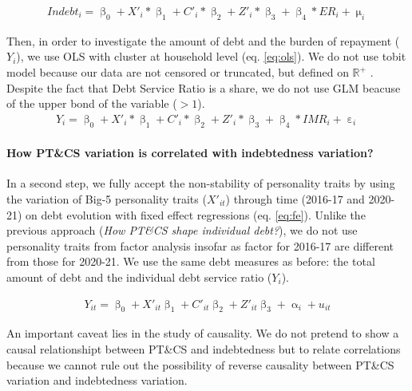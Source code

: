\documentclass[a4paper, 11pt, onecolumn]{article}
\begin{document}
\begin{equation}\label{eq:probit}
\begin{split}
Indebt_{i}=\upbeta_{0}+X'_{i}*\upbeta_{1}+C'_{i}*\upbeta_{2}+Z'_{i}*\upbeta_{3}+\upbeta_{4}*ER_{i}+\upmu_{i}
\end{split}
\end{equation}

Then, in order to investigate the amount of debt and the burden of repayment ($Y_{i}$), we use OLS with cluster at household level (eq. \ref{eq:ols}).
We do not use tobit model because our data are not censored or truncated, but defined on $\mathbb{R}^{+}$ \citep{Maddala1991}.
Despite the fact that Debt Service Ratio is a share, we do not use GLM beacuse of the upper bond of the variable ($>1$).
\begin{equation}\label{eq:ols}
\begin{split}
Y_{i}=\upbeta_{0}+X'_{i}*\upbeta_{1}+C'_{i}*\upbeta_{2}+Z'_{i}*\upbeta_{3}+\upbeta_{4}*IMR_{i}+\upepsilon_i
\end{split}
\end{equation}

\paragraph{How PT\&CS variation is correlated with indebtedness variation?}
In a second step, we fully accept the non-stability of personality traits by using the variation of Big-5 personality traits ($X'_{it}$) through time (2016-17 and 2020-21) on debt evolution with fixed effect regressions (eq. \ref{eq:fe}). 
Unlike the previous approach (\textit{How PT\&CS shape individual debt?}), we do not use personality traits from factor analysis insofar as factor for 2016-17 are different from those for 2020-21. 
We use the same debt measures as before: the total amount of debt and the individual debt service ratio ($Y_{i}$).

\begin{equation}\label{eq:fe}
\begin{split}
Y_{it}=\upbeta_{0}+X'_{it}\upbeta_{1}+C'_{it}\upbeta_{2}+Z'_{it}\upbeta_{3}+\upalpha_{i}+u_{it}
\end{split}
\end{equation}

An important caveat lies in the study of causality.
We do not pretend to show a causal relationshipt between PT\&CS and indebtedness but to relate correlations because we cannot rule out the possibility of reverse causality between PT\&CS variation and indebtedness variation.
\end{document}
